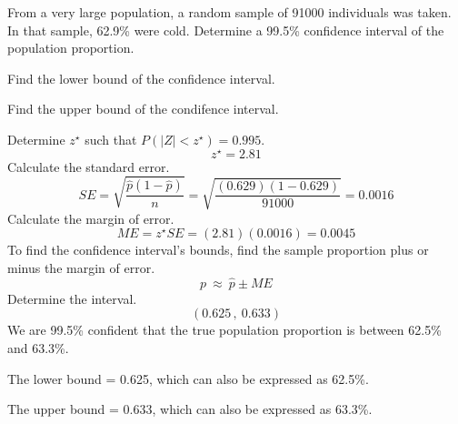 
\begin{question}
From a very large population, a random sample of 91000 individuals was
taken. In that sample, 62.9\% were cold. Determine a 99.5\% confidence
interval of the population proportion.
\begin{answerlist}
  \item Find the lower bound of the confidence interval.
  \item Find the upper bound of the condifence interval.
\end{answerlist}
\end{question}

\begin{solution}
Determine \(z^\star\) such that \(P(|Z|<z^\star) = 0.995\).
\[z^\star = 2.81 \] Calculate the standard error.
\[SE = \sqrt{\frac{\hat{p}(1-\hat{p})}{n}} = \sqrt{\frac{(0.629)(1-0.629)}{91000}} = 0.0016 \]
Calculate the margin of error.
\[ME = z^\star SE = (2.81)(0.0016) = 0.0045 \] To find the confidence
interval's bounds, find the sample proportion plus or minus the margin
of error. \[p ~\approx~ \hat{p} \pm ME \] Determine the interval.
\[(0.625\,,~ 0.633) \] We are 99.5\% confident that the true population
proportion is between 62.5\% and 63.3\%.
\begin{answerlist}
  \item The lower bound = 0.625, which can also be expressed as 62.5\%.
  \item The upper bound = 0.633, which can also be expressed as 63.3\%.
\end{answerlist}
\end{solution}

